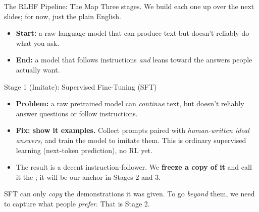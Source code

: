 \begin{frame}{The RLHF Pipeline: The Map}
Three stages. We build each one up over the next slides; for now, just the plain
English.
\vfill
\centering
{}
\vfill
\begin{itemize}\itemsep0.25em\small
    \item \textbf{Start:} a raw language model that can produce text but doesn't
          reliably do what you ask.
    \item \textbf{End:} a model that follows instructions \emph{and} leans toward
          the answers people actually want.
\end{itemize}
\end{frame}

\begin{frame}{Stage 1 (Imitate): Supervised Fine-Tuning (SFT)}
\begin{itemize}\itemsep0.5em
    \item \textbf{Problem:} a raw pretrained model can \emph{continue} text, but
          doesn't reliably answer questions or follow instructions.
    \item \textbf{Fix: show it examples.} Collect prompts paired with
          \emph{human-written ideal answers}, and train the model to imitate them.
          This is ordinary supervised learning (next-token prediction), no RL
          yet.
    \item The result is a decent instruction-follower. We \textbf{freeze a copy of
          it} and call it the ; it will
          be our anchor in Stages 2 and 3.
\end{itemize}
\vspace{0.5em}
\begin{center}\footnotesize
SFT can only \emph{copy} the demonstrations it was given. To go \emph{beyond} them,
we need to capture what people \emph{prefer}. That is Stage 2.
\end{center}
\end{frame}

